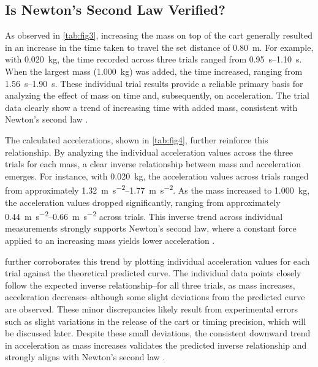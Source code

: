 ﻿\documentclass[reprint,amsmath,amssymb.aps]{revtex4-2}
\begin{document}
\subsection{Is Newton’s Second Law Verified?}
As observed in \cref{tab:fig3}, increasing the mass on top of the cart generally resulted in an increase in the time taken to travel the set distance of \qty{0.80}{\meter}. For example, with \qty{0.020}{\kilo\gram}, the time recorded across three trials ranged from \qtyrange{0.95}{1.10}{\second}. When the largest mass (\qty{1.000}{\kilo\gram}) was added, the time increased, ranging from \qtyrange{1.56}{1.90}{\second}. These individual trial results provide a reliable primary basis for analyzing the effect of mass on time and, subsequently, on acceleration. The trial data clearly show a trend of increasing time with added mass, consistent with Newton’s second law \cite{knight2017physics}.

The calculated accelerations, shown in \cref{tab:fig4}, further reinforce this relationship. By analyzing the individual acceleration values across the three trials for each mass, a clear inverse relationship between mass and acceleration emerges. For instance, with \qty{0.020}{\kilo\gram}, the acceleration values across trials ranged from approximately \qtyrange{1.32}{1.77}{\meter\per\second\squared}. As the mass increased to \qty{1.000}{\kilo\gram}, the acceleration values dropped significantly, ranging from approximately \qtyrange{0.44}{0.66}{\meter\per\second\squared} across trials. This inverse trend across individual measurements strongly supports Newton’s second law, where a constant force applied to an increasing mass yields lower acceleration \cite{knight2017physics}. 

 further corroborates this trend by plotting individual acceleration values for each trial against the theoretical predicted curve. The individual data points closely follow the expected inverse relationship–for all three trials, as mass increases, acceleration decreases–although some slight deviations from the predicted curve are observed. These minor discrepancies likely result from experimental errors such as slight variations in the release of the cart or timing precision, which will be discussed later. Despite these small deviations, the consistent downward trend in acceleration as mass increases validates the predicted inverse relationship and strongly aligns with Newton’s second law \cite{knight2017physics}.
\end{document}
